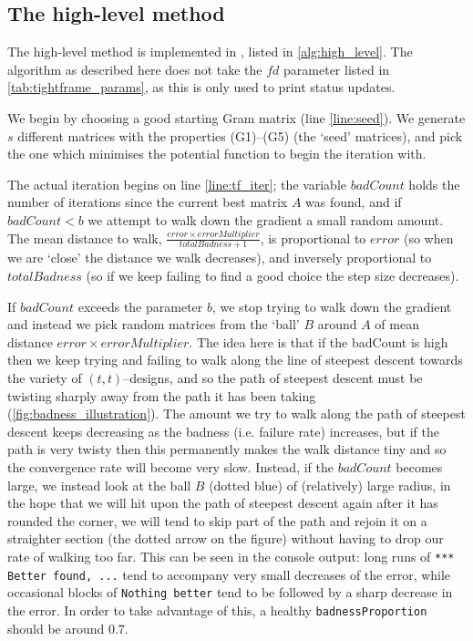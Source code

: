 \documentclass{article}
\theoremstyle{definition}
\begin{document}
  \subsection{The high-level method}
  The high-level method is implemented in , listed in \cref{alg:high_level}.
  The algorithm as described here does not take the $ fd $ parameter listed in \cref{tab:tightframe_params},
  as this is only used to print status updates.
  
  We begin by choosing a good starting Gram matrix (line \ref{line:seed}). We generate $ s $ different matrices
  with the properties (G1)--(G5) (the `seed' matrices), and pick the one which minimises the potential function
  to begin the iteration with.
  
  The actual iteration begins on line \ref{line:tf_iter}; the variable $ badCount $ holds the number of iterations
  since the current best matrix $ A $ was found, and if $ badCount < b $ we attempt to walk down the gradient
  a small random amount. The mean distance to walk, $ \frac{error \times errorMultiplier}{totalBadness + 1} $,
  is proportional to $ error $ (so when we are `close' the distance we walk decreases), and inversely proportional
  to $ totalBadness $ (so if we keep failing to find a good choice the step size decreases).
  
  If $ badCount $ exceeds the parameter $ b $, we stop trying to walk down the gradient and instead we pick
  random matrices from the `ball' $ B $ around $ A $ of mean distance $ error\times errorMultiplier$. The idea here
  is that if the badCount is high then we keep trying and failing to walk along the line of steepest descent
  towards the variety of $ (t,t)$--designs, and so the path of steepest descent must be twisting sharply away
  from the path it has been taking (\cref{fig:badness_illustration}). The amount we try to walk along the path
  of steepest descent keeps decreasing as the badness (i.e. failure rate) increases, but if the path is very
  twisty then this permanently makes the walk distance tiny and so the convergence rate will become very slow.
  Instead, if the $badCount$ becomes large, we instead look at the ball $ B $ (dotted blue) of (relatively) large radius, in
  the hope that we will hit upon the path of steepest descent again after it has rounded the corner, we will tend
  to skip part of the path and rejoin it on a straighter section (the dotted arrow on the figure) without having to
  drop our rate of walking too far. This can be seen in the console output: long runs of \texttt{*** Better found, ...} tend to
  accompany very small decreases of the error, while occasional blocks of \texttt{Nothing better}  tend to be followed by a sharp decrease
  in the error. In order to take advantage of this, a healthy \texttt{badnessProportion} should be around 0.7.
\end{document}
